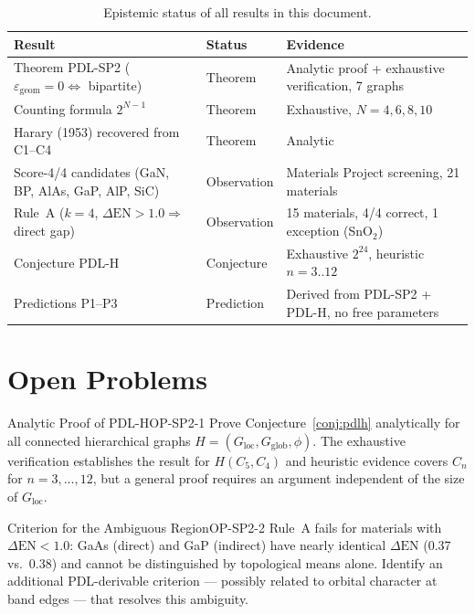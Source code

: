 \documentclass[12pt,a4paper]{article}
\newcommand{\epsgeom}{\varepsilon_{\mathrm{geom}}}
\newcommand{\DEN}{\Delta\mathrm{EN}}
\newcommand{\Gloc}{G_{\mathrm{loc}}}
\newcommand{\Gglob}{G_{\mathrm{glob}}}
\begin{document}
\begin{table}[h]
\centering
\caption{Epistemic status of all results in this document.}
\label{tab:epistemic}
\begin{tabular}{p{5cm}p{3cm}p{5cm}}
\toprule
Result & Status & Evidence \\
\midrule
Theorem PDL-SP2 ($\epsgeom=0 \Leftrightarrow$ bipartite)
  & Theorem & Analytic proof + exhaustive verification, 7 graphs \\
Counting formula $2^{N-1}$
  & Theorem & Exhaustive, $N=4,6,8,10$ \\
Harary (1953) recovered from C1--C4
  & Theorem & Analytic \\
Score-4/4 candidates (GaN, BP, AlAs, GaP, AlP, SiC)
  & Observation & Materials Project screening, 21 materials \\
Rule~A ($k=4$, $\DEN>1.0 \Rightarrow$ direct gap)
  & Observation & 15 materials, 4/4 correct, 1 exception (SnO$_2$) \\
Conjecture PDL-H
  & Conjecture & Exhaustive $2^{24}$, heuristic $n=3..12$ \\
Predictions P1--P3
  & Prediction & Derived from PDL-SP2 + PDL-H, no free parameters \\
\bottomrule
\end{tabular}
\end{table}

\section{Open Problems}
\label{sec:open}

\begin{openproblem}{Analytic Proof of PDL-H}{OP-SP2-1}
Prove Conjecture~\ref{conj:pdlh} analytically for all connected
hierarchical graphs $H = (\Gloc, \Gglob, \phi)$. The exhaustive
verification establishes the result for $H(C_5, C_4)$ and heuristic
evidence covers $C_n$ for $n = 3,\ldots,12$, but a general proof
requires an argument independent of the size of $\Gloc$.
\end{openproblem}

\begin{openproblem}{Criterion for the Ambiguous Region}{OP-SP2-2}
Rule~A fails for materials with $\DEN < 1.0$: GaAs (direct) and
GaP (indirect) have nearly identical $\DEN$ (0.37 vs.\ 0.38) and
cannot be distinguished by topological means alone. Identify
an additional PDL-derivable criterion — possibly related to orbital
character at band edges — that resolves this ambiguity.
\end{openproblem}
\end{document}
